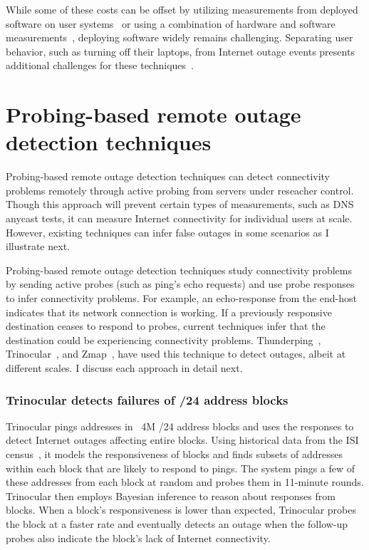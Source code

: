 While some of these costs can be offset by utilizing measurements from
deployed software on user systems~\cite{netdimes, dhcp-dimes, Dasu:NSDI2013} or using a combination of hardware
and software measurements~\cite{IMC2014-Broadband-bischof}, deploying software widely remains
challenging. Separating user behavior, such as turning off their laptops, from
Internet outage events presents additional challenges for these techniques~\cite{dhcp-dimes}.
 
\section{Probing-based remote outage detection techniques}


Probing-based remote outage detection techniques can detect
connectivity problems remotely through active probing from servers
under reseacher control. Though this approach will prevent 
certain types of measurements, such as DNS anycast tests, it can measure
Internet connectivity for individual users at scale. However,
existing techniques can infer false outages in some scenarios as I
illustrate next.

Probing-based remote outage detection techniques study connectivity problems by
sending active probes (such as ping's echo requests) and use probe
responses to infer connectivity problems. For example, an
echo-response from the end-host indicates that its network connection
is working. If a previously responsive destination ceases to respond
to probes, current techniques infer that the destination could be
experiencing connectivity problems. Thunderping~\cite{pingin},
Trinocular~\cite{trinocular}, and Zmap~\cite{durumeric2013zmap}, have
used this technique to detect outages, albeit at different scales. I
discuss each approach in detail next.

\subsubsection{Trinocular detects failures of /24 address blocks}

Trinocular pings addresses in ~4M /24 address blocks and
uses the responses to detect Internet outages affecting entire blocks. Using historical
data from the ISI census~\cite{census-survey}, it models the responsiveness of
blocks and finds subsets of addresses within each block that are
likely to respond to pings. The system pings a few of these addresses
from each block at random and probes them in 11-minute
rounds. Trinocular then employs Bayesian inference to reason about
responses from blocks. When a block's responsiveness is lower than
expected, Trinocular probes the block at a faster rate and eventually
detects an outage when the follow-up probes also indicate the block's
lack of Internet connectivity.

